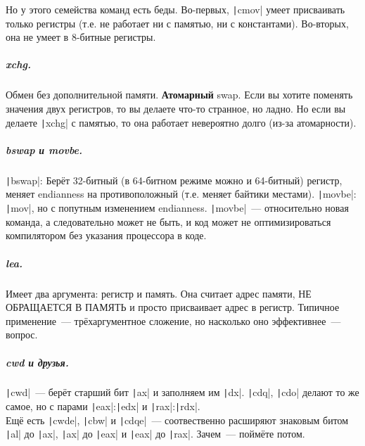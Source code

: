 \documentclass{article}
\begin{document}
\begin{itemize}
        Но у этого семейства команд есть беды. Во-первых, \texttt|cmov| умеет присваивать только регистры (т.е. не работает ни с памятью, ни с константами). Во-вторых, она не умеет в 8-битные регистры.
    \end{itemize}
    \subparagraph{xchg.}
    Обмен без дополнительной памяти. \textbf{Атомарный} swap. Если вы хотите поменять значения двух регистров, то вы делаете что-то странное, но ладно. Но если вы делаете \texttt|xchg| с памятью, то она работает невероятно долго (из-за атомарности).
    \subparagraph{bswap и movbe.}
    \texttt|bswap|: Берёт 32-битный (в 64-битном режиме можно и 64-битный) регистр, меняет endianness на противоположный (т.е. меняет байтики местами). \texttt|movbe|: \texttt|mov|, но с попутным изменением endianness. \texttt|movbe|~--- относительно новая команда, а следовательно может не быть, и код может не оптимизироваться компилятором без указания процессора в коде.
    \subparagraph{lea.}
    Имеет два аргумента: регистр и память. Она считает адрес памяти, НЕ ОБРАЩАЕТСЯ В ПАМЯТЬ и просто присваивает адрес в регистр. Типичное применение~--- трёхаргументное сложение, но насколько оно эффективнее~--- вопрос.
    \subparagraph{cwd и друзья.}\label{subpar:cwd}
    \texttt|cwd|~--- берёт старший бит \texttt|ax| и заполняем им \texttt|dx|. \texttt|cdq|, \texttt|cdo| делают то же самое, но с парами \texttt|eax|:\texttt|edx| и \texttt|rax|:\texttt|rdx|.\\
    Ещё есть \texttt|cwde|, \texttt|cbw| и \texttt|cdqe|~--- соотвественно расширяют знаковым битом \texttt|al| до \texttt|ax|, \texttt|ax| до \texttt|eax| и \texttt|eax| до \texttt|rax|. Зачем~--- поймёте потом.
\end{document}
